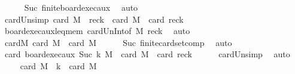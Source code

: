 \begin{isabellebody}
\ \ \ \ \isamarkupfalse%
\ Suc\ finite{\isacharunderscore}{\kern0pt}board{\isacharunderscore}{\kern0pt}exec{\isacharunderscore}{\kern0pt}aux\ \isamarkupfalse%
\ auto\isanewline
\ \ \isamarkupfalse%
\ \isamarkupfalse%
\ card{\isacharunderscore}{\kern0pt}Un{\isacharunderscore}{\kern0pt}simp{\isacharcolon}{\kern0pt}\ {\isachardoublequoteopen}card\ {\isacharparenleft}{\kern0pt}{\isacharquery}{\kern0pt}M{\isacharprime}{\kern0pt}\ {\isasymunion}\ {\isacharquery}{\kern0pt}rec{\isacharunderscore}{\kern0pt}k{\isacharparenright}{\kern0pt}\ {\isacharequal}{\kern0pt}\ card\ {\isacharquery}{\kern0pt}M{\isacharprime}{\kern0pt}\ {\isacharplus}{\kern0pt}\ card\ {\isacharquery}{\kern0pt}rec{\isacharunderscore}{\kern0pt}k{\isachardoublequoteclose}\isanewline
\ \ \ \ \isamarkupfalse%
\ board{\isacharunderscore}{\kern0pt}exec{\isacharunderscore}{\kern0pt}aux{\isacharunderscore}{\kern0pt}leq{\isacharunderscore}{\kern0pt}mem\ card{\isacharunderscore}{\kern0pt}Un{\isacharunderscore}{\kern0pt}Int{\isacharbrackleft}{\kern0pt}of\ {\isacharquery}{\kern0pt}M{\isacharprime}{\kern0pt}\ {\isacharquery}{\kern0pt}rec{\isacharunderscore}{\kern0pt}k{\isacharbrackright}{\kern0pt}\ \isamarkupfalse%
\ auto\isanewline
\ \ \isanewline
\ \ \isamarkupfalse%
\ card{\isacharunderscore}{\kern0pt}M{\isacharcolon}{\kern0pt}\ {\isachardoublequoteopen}card\ {\isacharquery}{\kern0pt}M{\isacharprime}{\kern0pt}\ {\isacharequal}{\kern0pt}\ card\ M{\isachardoublequoteclose}\isanewline
\ \ \ \ \isamarkupfalse%
\ Suc\ finite{\isacharunderscore}{\kern0pt}card{\isacharunderscore}{\kern0pt}set{\isacharunderscore}{\kern0pt}comp\ \isamarkupfalse%
\ auto\isanewline
\ \ \isanewline
\ \ \isamarkupfalse%
\ {\isachardoublequoteopen}card\ {\isacharparenleft}{\kern0pt}board{\isacharunderscore}{\kern0pt}exec{\isacharunderscore}{\kern0pt}aux\ {\isacharparenleft}{\kern0pt}Suc\ k{\isacharparenright}{\kern0pt}\ M{\isacharparenright}{\kern0pt}\ {\isacharequal}{\kern0pt}\ card\ {\isacharquery}{\kern0pt}M{\isacharprime}{\kern0pt}\ {\isacharplus}{\kern0pt}\ card\ {\isacharquery}{\kern0pt}rec{\isacharunderscore}{\kern0pt}k{\isachardoublequoteclose}\isanewline
\ \ \ \ \isamarkupfalse%
\ card{\isacharunderscore}{\kern0pt}Un{\isacharunderscore}{\kern0pt}simp\ \isamarkupfalse%
\ auto\isanewline
\ \ \isamarkupfalse%
\ \isamarkupfalse%
\ {\isachardoublequoteopen}{\isachardot}{\kern0pt}{\isachardot}{\kern0pt}{\isachardot}{\kern0pt}\ {\isacharequal}{\kern0pt}\ card\ M\ {\isacharplus}{\kern0pt}\ k\ {\isacharasterisk}{\kern0pt}\ card\ M{\isachardoublequoteclose}\isanewline

\end{isabellebody}
